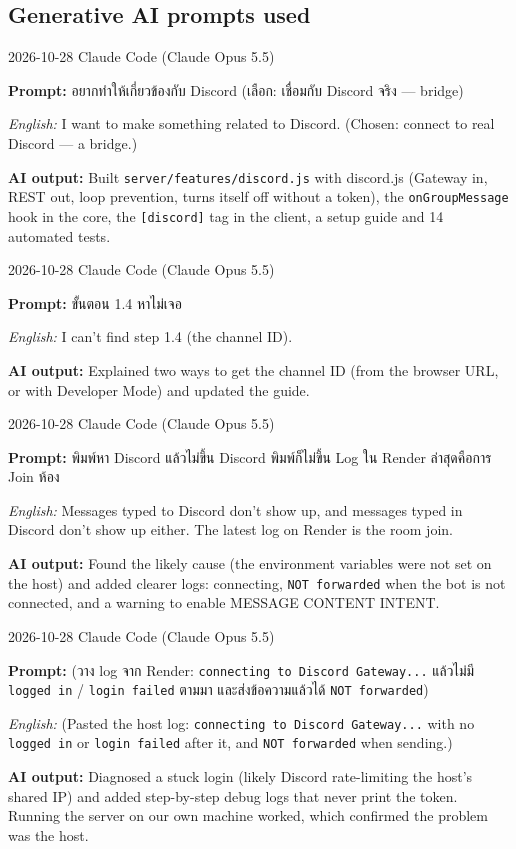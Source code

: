 \documentclass[11pt,a4paper]{article}
\newcommand{\code}[1]{\texttt{#1}}
\newcommand{\promptbox}[4]{%
\begin{tcolorbox}[colback=codebg,colframe=gray!50,boxrule=0.4pt,left=4pt,right=4pt,top=2pt,bottom=2pt]
{\small #1 \quad Claude Code (Claude Opus 5.5)}\par
\textbf{Prompt:} #2\par
\textit{English:} #3\par
\textbf{AI output:} #4
\end{tcolorbox}}
\begin{document}
\subsection*{Generative AI prompts used}
\promptbox{2026-10-28}{อยากทำให้เกี่ยวข้องกับ Discord \newline (เลือก: เชื่อมกับ Discord จริง --- bridge)}{I want to make something related to Discord. (Chosen: connect to real Discord --- a bridge.)}{Built \code{server/features/discord.js} with discord.js (Gateway in, REST out, loop prevention, turns itself off without a token), the \code{onGroupMessage} hook in the core, the \code{[discord]} tag in the client, a setup guide and 14 automated tests.}
\promptbox{2026-10-28}{ขั้นตอน 1.4 หาไม่เจอ}{I can't find step 1.4 (the channel ID).}{Explained two ways to get the channel ID (from the browser URL, or with Developer Mode) and updated the guide.}
\promptbox{2026-10-28}{พิมพ์หา Discord แล้วไม่ขึ้น Discord พิมพ์ก็ไม่ขึ้น Log ใน Render ล่าสุดคือการ Join ห้อง}{Messages typed to Discord don't show up, and messages typed in Discord don't show up either. The latest log on Render is the room join.}{Found the likely cause (the environment variables were not set on the host) and added clearer logs: connecting, \code{NOT forwarded} when the bot is not connected, and a warning to enable MESSAGE CONTENT INTENT.}
\promptbox{2026-10-28}{(วาง log จาก Render: \code{connecting to Discord Gateway...} แล้วไม่มี \code{logged in} / \code{login failed} ตามมา และส่งข้อความแล้วได้ \code{NOT forwarded})}{(Pasted the host log: \code{connecting to Discord Gateway...} with no \code{logged in} or \code{login failed} after it, and \code{NOT forwarded} when sending.)}{Diagnosed a stuck login (likely Discord rate-limiting the host's shared IP) and added step-by-step debug logs that never print the token. Running the server on our own machine worked, which confirmed the problem was the host.}
\end{document}
